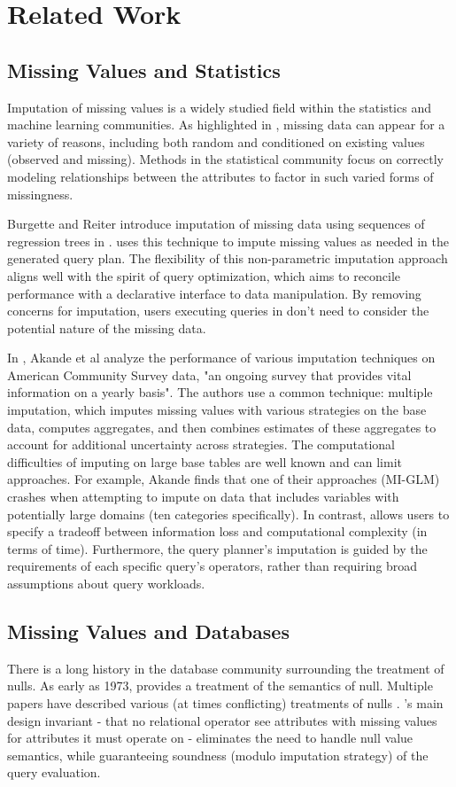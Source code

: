 \section{Related Work}
\subsection{Missing Values and Statistics}
Imputation of missing values is a widely studied field within the statistics and machine
learning communities. As highlighted in \cite{gelman2006data}, missing data
can appear for a variety of reasons, including both random and conditioned on
existing values (observed and missing). Methods in the statistical community
focus on correctly modeling relationships between the attributes to factor in
such varied forms of missingness.

Burgette and Reiter introduce imputation of missing data using sequences
of regression trees in \cite{burgette2010multiple}. \ProjectName{} uses
this technique to impute missing values as needed in the generated query plan.
The flexibility of this non-parametric imputation approach aligns well with the
spirit of query optimization, which aims to reconcile performance with a declarative interface to
data manipulation. By removing concerns for imputation, users executing queries
in \ProjectName{} don't need to consider the potential nature of the missing data.

In \cite{akande2015empirical}, Akande et al analyze the performance of various
imputation techniques on American Community Survey data, "an ongoing survey
that provides vital information on a yearly basis"\cite{censusbureau}. The authors
use a common technique: multiple imputation, which imputes missing values
with various strategies on the base data, computes aggregates, and then
combines estimates of these aggregates to account for additional uncertainty across
strategies. The computational difficulties of imputing on large base tables
are well known and can limit approaches. For example, Akande finds that
one of their approaches (MI-GLM) crashes when attempting to impute on data that
includes variables with potentially large domains (ten categories specifically).
 In contrast, \ProjectName{} allows users to specify a tradeoff
between information loss and computational complexity (in terms of time). 
Furthermore, the query planner's imputation is guided by the requirements of
each specific query's operators, rather than requiring broad assumptions
about query workloads.


\subsection{Missing Values and Databases}
There is a long history in the database community surrounding the
treatment of nulls. As early as 1973, \cite{codd1973understanding}
provides a treatment of the semantics of null. Multiple
papers have described various (at times conflicting) treatments
of nulls \cite{grant1977null}. \ProjectName's main design invariant - that no relational operator
see attributes with missing values for attributes it must operate on - eliminates
the need to handle null value semantics, while guaranteeing soundness (modulo
imputation strategy) of the query evaluation.

